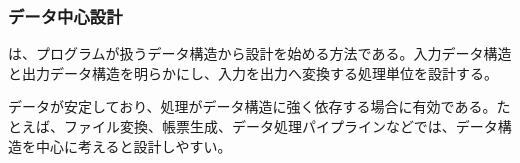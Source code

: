 \subsubsection{データ中心設計}

 は、プログラムが扱うデータ構造から設計を始める方法である。入力データ構造と出力データ構造を明らかにし、入力を出力へ変換する処理単位を設計する。

データが安定しており、処理がデータ構造に強く依存する場合に有効である。たとえば、ファイル変換、帳票生成、データ処理パイプラインなどでは、データ構造を中心に考えると設計しやすい。
